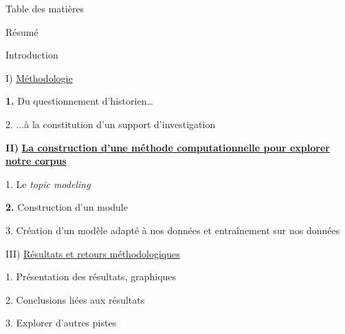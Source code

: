 \documentclass[letterpaper,portrait,12pt]{article}
\begin{document}
Table des mati\`{e}res





R\'{e}sum\'{e}





Introduction











I) \uline{M\'{e}thodologie}





\textbf{1. }Du questionnement d'historien\ldots{}





2. ...\`{a} la constitution d'un support d'investigation








\textbf{II) }\textbf{\uline{La construction d'une m\'{e}thode computationnelle pour explorer notre corpus}}





1. Le \emph{topic modeling}





\textbf{2.} Construction d'un module





3. Cr\'{e}ation d'un mod\`{e}le adapt\'{e} \`{a} nos donn\'{e}es et entra\^{i}nement sur nos donn\'{e}es











III) \uline{R\'{e}sultats et retours m\'{e}thodologiques}





1. Pr\'{e}sentation des r\'{e}sultats, graphiques





2. Conclusions li\'{e}es aux r\'{e}sultats





3. Explorer d'autres pistes
\end{document}
